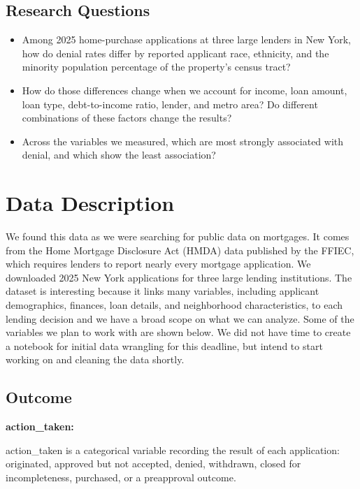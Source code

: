 \documentclass[manuscript,authorversion,nonacm]{acmart}
\begin{document}
\subsection{Research Questions}

\begin{itemize}
    \item[\textbf{(RQ1)}] Among 2025 home-purchase applications at three large lenders in New York, how do denial rates differ by reported applicant race, ethnicity, and the minority population percentage of the property's census tract?
    \item[\textbf{(RQ2)}] How do those differences change when we account for income, loan amount, loan type, debt-to-income ratio, lender, and metro area? Do different combinations of these factors change the results?
    \item[\textbf{(RQ3)}] Across the variables we measured, which are most strongly associated with denial, and which show the least association?
\end{itemize}

\section{Data Description}

We found this data as we were searching for public data on mortgages. It comes from the Home Mortgage Disclosure Act (HMDA) data published by the FFIEC, which requires lenders to report nearly every mortgage application. We downloaded 2025 New York applications for three large lending institutions. The dataset is interesting because it links many variables, including applicant demographics, finances, loan details, and neighborhood characteristics, to each lending decision and we have a broad scope on what we can analyze. Some of the variables we plan to work with are shown below. We did not have time to create a notebook for initial data wrangling for this deadline, but intend to start working on and cleaning the data shortly.

\subsection{Outcome}

\noindent\textbf{action\_taken:}

action\_taken is a categorical variable recording the result of each application: originated, approved but not accepted, denied, withdrawn, closed for incompleteness, purchased, or a preapproval outcome.
\end{document}
